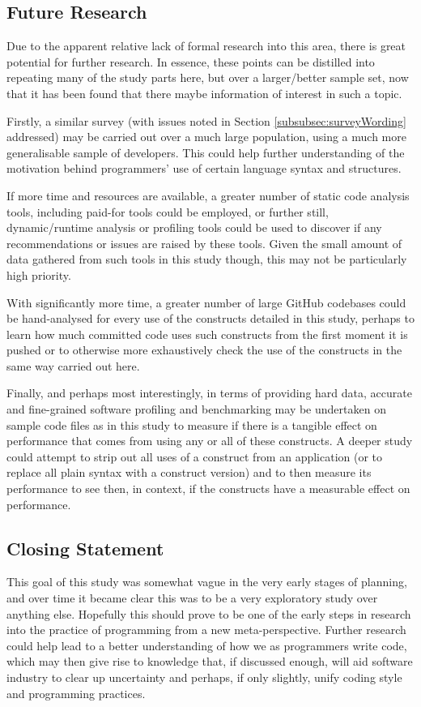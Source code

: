 \documentclass{article}
\begin{document}
    \subsection{Future Research}
        Due to the apparent relative lack of formal research into this area, there is great potential for further research. In essence, these points can be distilled into repeating many of the study parts here, but over a larger/better sample set, now that it has been found that there maybe information of interest in such a topic.
        
        Firstly, a similar survey (with issues noted in Section \ref{subsubsec:surveyWording} addressed) may be carried out over a much large population, using a much more generalisable sample of developers. This could help further understanding of the motivation behind programmers' use of certain language syntax and structures.
            
        If more time and resources are available, a greater number of static code analysis tools, including paid-for tools could be employed, or further still, dynamic/runtime analysis or profiling tools could be used to discover if any recommendations or issues are raised by these tools. Given the small amount of data gathered from such tools in this study though, this may not be particularly high priority.
        
        With significantly more time, a greater number of large GitHub codebases could be hand-analysed for every use of the constructs detailed in this study, perhaps to learn how much committed code uses such constructs from the first moment it is pushed or to otherwise more exhaustively check the use of the constructs in the same way carried out here.
            
        Finally, and perhaps most interestingly, in terms of providing hard data, accurate and fine-grained software profiling and benchmarking may be undertaken on sample code files as in this study to measure if there is a tangible effect on performance that comes from using any or all of these constructs. A deeper study could attempt to strip out all uses of a construct from an application (or to replace all plain syntax with a construct version) and to then measure its performance to see then, in context, if the constructs have a measurable effect on performance.
    
    \subsection{Closing Statement}
        This goal of this study was somewhat vague in the very early stages of planning, and over time it became clear this was to be a very exploratory study over anything else. Hopefully this should prove to be one of the early steps in research into the practice of programming from a new meta-perspective. Further research could help lead to a better understanding of how we as programmers write code, which may then give rise to knowledge that, if discussed enough,  will aid software industry to clear up uncertainty and perhaps, if only slightly, unify coding style and programming practices.
\end{document}
